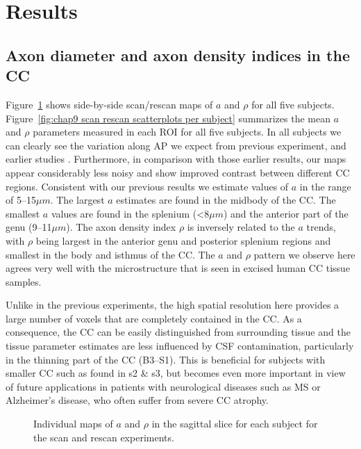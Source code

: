 \FloatBarrier
\section{Results}
\subsection{Axon diameter and axon density indices in the CC}
Figure~\ref{fig:chap9 scan rescan maps per subject} shows side-by-side scan/rescan maps of $a$ and $\rho$ for all five subjects. Figure~\ref{fig:chap9 scan rescan scatterplots per subject} summarizes the mean $a$ and $\rho$ parameters measured in each \gls{ROI} for all five subjects. In all subjects we can clearly see the variation along AP we expect from previous experiment, and earlier studies \citep{Alexander:2010}. Furthermore, in comparison with those earlier results, our maps appear considerably less noisy and show improved contrast between different \gls{CC} regions. Consistent with our previous results we estimate values of $a$ in the range of 5--15$\mu m$. The largest $a$ estimates are found in the midbody of the \gls{CC}. The smallest $a$ values are found in the splenium (<8$\mu m$) and the anterior part of the genu (9--11$\mu m$). The axon density index $\rho$ is inversely related to the $a$ trends, with $\rho$ being largest in the anterior genu and posterior splenium regions and smallest in the body and isthmus of the \gls{CC}. The $a$ and $\rho$ pattern we observe here agrees very well with the microstructure that is seen in excised human \gls{CC} tissue samples\citep{Aboitiz:1992}.


Unlike in the previous experiments, the high spatial resolution here provides a large number of voxels that are completely contained in the \gls{CC}. As a consequence, the \gls{CC} can be easily distinguished from surrounding tissue and the tissue parameter estimates are less influenced by CSF contamination, particularly in the thinning part of the \gls{CC} (B3--S1). This is beneficial for subjects with smaller \gls{CC} such as found in s2 \& s3, but becomes even more important in view of future applications in patients with neurological diseases such as MS or Alzheimer's disease, who often suffer from severe \gls{CC} atrophy. 
\begin{figure}[ht]
	\centering
	\caption{Individual maps of $a$ and $\rho$ in the sagittal slice for each subject for the scan and rescan experiments.}
	\label{fig:chap9 scan rescan maps per subject}
\end{figure}


